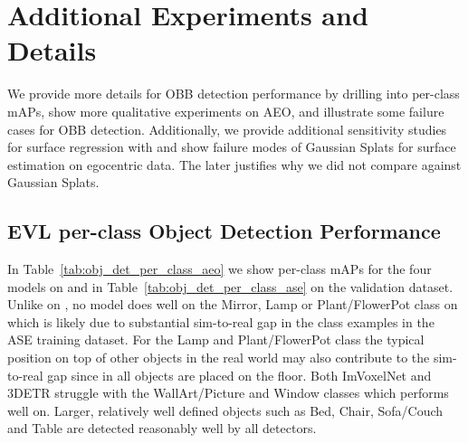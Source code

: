 \section{Additional Experiments and Details}

We provide more details for \EVL{} OBB detection performance by drilling into per-class mAPs, show more qualitative experiments on AEO, and illustrate some failure cases for OBB detection. 
Additionally, we provide additional sensitivity studies for surface regression with \EVL{} and show failure modes of Gaussian Splats for surface estimation on egocentric data. The later justifies why we did not compare against Gaussian Splats.




\subsection{EVL per-class Object Detection Performance} 
\label{supp:per_class_perf}
In Table~\ref{tab:obj_det_per_class_aeo} we show per-class mAPs for the four models on \AOThree{} and in Table~\ref{tab:obj_det_per_class_ase} on the \ASE{} validation dataset. Unlike on \ASE{}, no model does well on the Mirror, Lamp or Plant/FlowerPot class on \AOThree{}  which is likely due to substantial sim-to-real gap in the class examples in the ASE training dataset. For the Lamp and Plant/FlowerPot class the typical position on top of other objects in the real world may also contribute to the sim-to-real gap since in \ASE{} all objects are placed on the floor. 
Both ImVoxelNet and 3DETR struggle with the WallArt/Picture and Window classes which \EVL{} performs well on.
Larger, relatively well defined objects such as Bed, Chair, Sofa/Couch and Table are detected reasonably well by all detectors.

